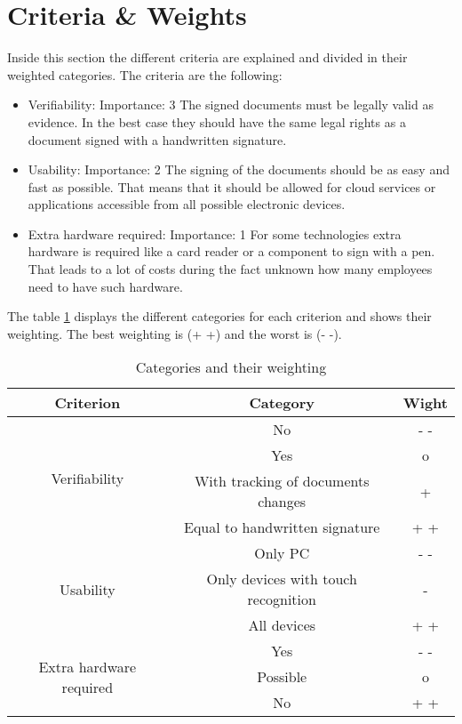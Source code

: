 \section{Criteria \& Weights} \label{sec:criteria}
Inside this section the different criteria are explained and divided in their weighted categories. The criteria are the following:
\begin{itemize}
	\item Verifiability: \newline
	Importance: 3 \newline
	The signed documents must be legally valid as evidence. In the best case they should have the same legal rights as a document signed with a handwritten signature.
	\item Usability: \newline
	Importance: 2 \newline
	The signing of the documents should be as easy and fast as possible. That means that it should be allowed for cloud services or applications accessible from all possible electronic devices. 
	\item Extra hardware required: \newline
	Importance: 1 \newline
	For some technologies extra hardware is required like a card reader or a component to sign with a pen. That leads to a lot of costs during the fact unknown how many employees need to have such hardware.
\end{itemize} 

The table \ref{Tab:criteria} displays the different categories for each criterion and shows their weighting. The best weighting is (+ +) and the worst is (- -). 

\begin{table}[h]
	\centering
	\begin{tabular}{|c|c|c|} \hline
		\rowcolor{Gray}Criterion  & Category & Wight \\ \hline
		\multirow{4}{*}{Verifiability} & No & - - \\ \cline{2-3}
									   & Yes & o \\ \cline{2-3}
									   & With tracking of documents changes & + \\ \cline{2-3}
									   & Equal to handwritten signature & + + \\ \cline{1-3}
		\multirow{3}{*}{Usability} & Only PC & - - \\ \cline{2-3}
		                           & Only devices with touch recognition & - \\ \cline{2-3}
								   & All devices & + + \\ \cline{1-3}
		\multirow{3}{*}{Extra hardware required} & Yes & - -\\ \cline{2-3}
												& Possible & o \\ \cline{2-3}
												& No & + +  \\ \cline{1-3}
	\end{tabular}
	\caption{Categories and their weighting}
	\label{Tab:criteria}
\end{table}